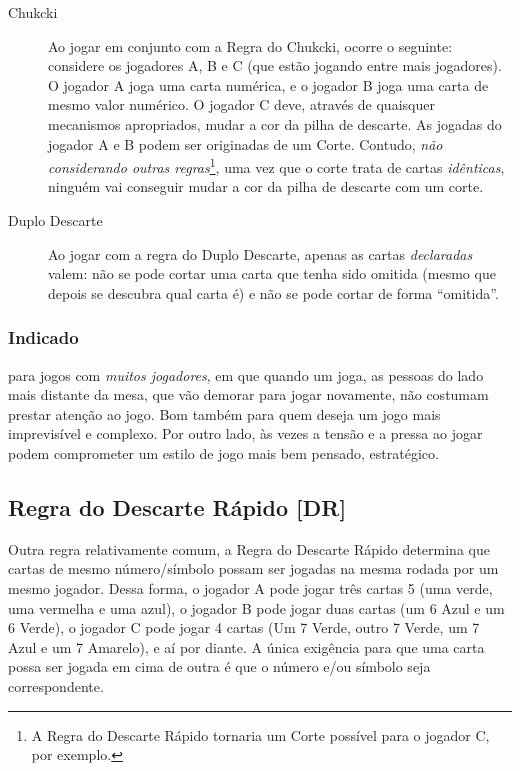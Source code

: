 \begin{description}
\item[Chukcki]{Ao jogar em conjunto com a Regra do Chukcki, ocorre o seguinte: considere os jogadores A, B e C (que estão jogando entre mais jogadores). O jogador A joga uma carta numérica, e o jogador B joga uma carta de mesmo valor numérico. O jogador C deve, através de quaisquer mecanismos apropriados, mudar a cor da pilha de descarte. As jogadas do jogador A e B podem ser originadas de um Corte. Contudo, \emph{não considerando outras regras}\footnote{A Regra do Descarte Rápido tornaria um Corte possível para o jogador C, por exemplo.}, uma vez que o corte trata de cartas \emph{idênticas}, ninguém vai conseguir mudar a cor da pilha de descarte com um corte.}
\item[Duplo Descarte]{Ao jogar com a regra do Duplo Descarte, apenas as cartas \emph{declaradas} valem: não se pode cortar uma carta que tenha sido omitida (mesmo que depois se descubra qual carta é) e não se pode cortar de forma ``omitida''.}
\end{description}

\subsubsection{Indicado} 

para jogos com \emph{muitos jogadores}, em que quando um joga, as pessoas do lado mais distante da mesa, que vão demorar para jogar novamente, não costumam prestar atenção ao jogo. Bom também para quem deseja um jogo mais imprevisível e complexo. Por outro lado, às vezes a tensão e a pressa ao jogar podem comprometer um estilo de jogo mais bem pensado, estratégico.

\subsection{Regra do Descarte Rápido [DR]}

\label{descarterapido}

Outra regra relativamente comum, a Regra do Descarte Rápido determina que cartas de mesmo número/símbolo possam ser jogadas na mesma rodada por um mesmo jogador. Dessa forma, o jogador A pode jogar três cartas 5 (uma verde, uma vermelha e uma azul), o jogador B pode jogar duas cartas (um 6 Azul e um 6 Verde), o jogador C pode jogar 4 cartas (Um 7 Verde, outro 7 Verde, um 7 Azul e um 7 Amarelo), e aí por diante. A única exigência para que uma carta possa ser jogada em cima de outra é que o número e/ou símbolo seja correspondente.

